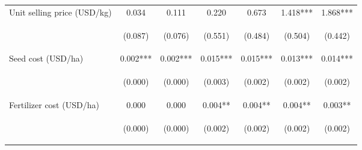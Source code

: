 \begin{center}
\begin{tabular}{lcccccc}
Unit selling price (USD/kg) & 0.034 & 0.111 & 0.220 & 0.673 & 1.418*** & 1.868*** \\
\vspace{4pt} & \begin{footnotesize}(0.087)\end{footnotesize} & \begin{footnotesize}(0.076)\end{footnotesize} & \begin{footnotesize}(0.551)\end{footnotesize} & \begin{footnotesize}(0.484)\end{footnotesize} & \begin{footnotesize}(0.504)\end{footnotesize} & \begin{footnotesize}(0.442)\end{footnotesize} \\
Seed cost (USD/ha) & 0.002*** & 0.002*** & 0.015*** & 0.015*** & 0.013*** & 0.014*** \\
\vspace{4pt} & \begin{footnotesize}(0.000)\end{footnotesize} & \begin{footnotesize}(0.000)\end{footnotesize} & \begin{footnotesize}(0.003)\end{footnotesize} & \begin{footnotesize}(0.002)\end{footnotesize} & \begin{footnotesize}(0.002)\end{footnotesize} & \begin{footnotesize}(0.002)\end{footnotesize} \\
Fertilizer cost (USD/ha) & 0.000 & 0.000 & 0.004** & 0.004** & 0.004** & 0.003** \\
\vspace{4pt} & \begin{footnotesize}(0.000)\end{footnotesize} & \begin{footnotesize}(0.000)\end{footnotesize} & \begin{footnotesize}(0.002)\end{footnotesize} & \begin{footnotesize}(0.002)\end{footnotesize} & \begin{footnotesize}(0.002)\end{footnotesize} & \begin{footnotesize}(0.002)\end{footnotesize} \\

\end{tabular}
\end{center}
